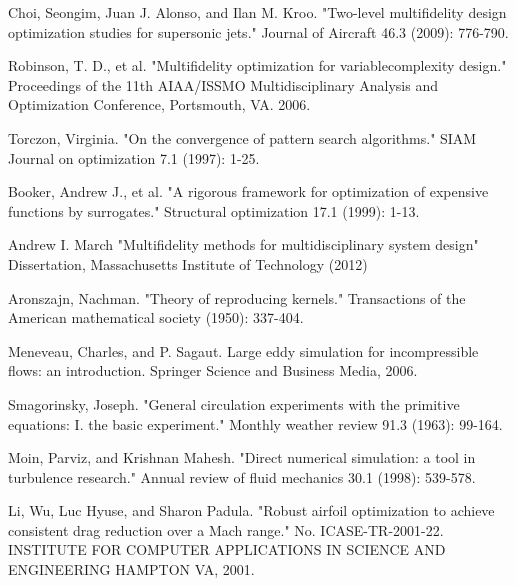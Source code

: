 \documentclass[a4paper,onecolumn]{article}
\theoremstyle{remark}
\begin{document}
\begin{thebibliography}{9}
Choi, Seongim, Juan J. Alonso, and Ilan M. Kroo. 
"Two-level multifidelity design optimization studies for supersonic jets." 
Journal of Aircraft 46.3 (2009): 776-790.


Robinson, T. D., et al. 
"Multifidelity optimization for variablecomplexity design."
Proceedings of the 11th AIAA/ISSMO Multidisciplinary Analysis and Optimization Conference, 
Portsmouth, VA. 2006.

Torczon, Virginia. 
"On the convergence of pattern search algorithms." 
SIAM Journal on optimization 7.1 (1997): 1-25.

Booker, Andrew J., et al. 
"A rigorous framework for optimization of expensive functions by surrogates." 
Structural optimization 17.1 (1999): 1-13.

Andrew I. March
"Multifidelity methods for multidisciplinary system design"
Dissertation, Massachusetts Institute of Technology (2012)

Aronszajn, Nachman. 
"Theory of reproducing kernels." 
Transactions of the American mathematical society (1950): 337-404.

Meneveau, Charles, and P. Sagaut. 
Large eddy simulation for incompressible flows: an introduction.
Springer Science and Business Media, 2006.

Smagorinsky, Joseph. 
"General circulation experiments with the primitive equations: I. the basic experiment." 
Monthly weather review 91.3 (1963): 99-164.

Moin, Parviz, and Krishnan Mahesh. 
"Direct numerical simulation: a tool in turbulence research." 
Annual review of fluid mechanics 30.1 (1998): 539-578.

Li, Wu, Luc Hyuse, and Sharon Padula. 
"Robust airfoil optimization to achieve consistent drag reduction over a Mach range."
No. ICASE-TR-2001-22. INSTITUTE FOR COMPUTER APPLICATIONS IN SCIENCE AND ENGINEERING HAMPTON VA, 2001.

\end{thebibliography}
\end{document}
